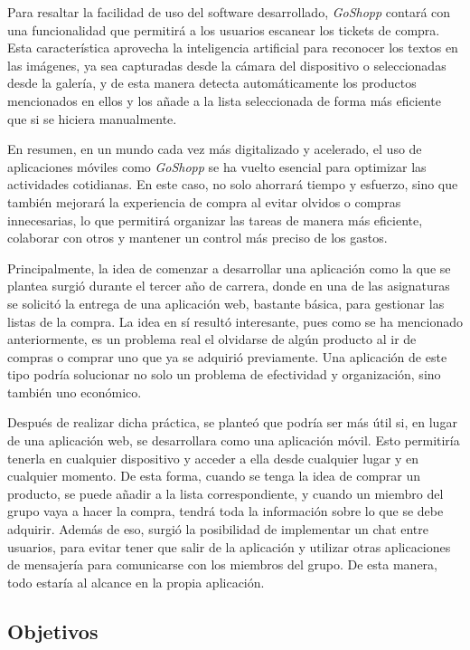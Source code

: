 \documentclass{article}
\begin{document}
Para resaltar la facilidad de uso del software desarrollado, \textit{GoShopp} contará con una funcionalidad que permitirá a los usuarios escanear los tickets de compra. Esta característica aprovecha la inteligencia artificial para reconocer los textos en las imágenes, ya sea capturadas desde la cámara del dispositivo o seleccionadas desde la galería, y de esta manera detecta automáticamente los productos mencionados en ellos y los añade a la lista seleccionada de forma más eficiente que si se hiciera manualmente.

En resumen, en un mundo cada vez más digitalizado y acelerado, el uso de aplicaciones móviles como \textit{GoShopp} se ha vuelto esencial para optimizar las actividades cotidianas. En este caso, no solo ahorrará tiempo y esfuerzo, sino que también mejorará la experiencia de compra al evitar olvidos o compras innecesarias, lo que permitirá organizar las tareas de manera más eficiente, colaborar con otros y mantener un control más preciso de los gastos.

Principalmente, la idea de comenzar a desarrollar una aplicación como la que se plantea surgió durante el tercer año de carrera, donde en una de las asignaturas se solicitó la entrega de una aplicación web, bastante básica, para gestionar las listas de la compra. La idea en sí resultó interesante, pues como se ha mencionado anteriormente, es un problema real el olvidarse de algún producto al ir de compras o comprar uno que ya se adquirió previamente. Una aplicación de este tipo podría solucionar no solo un problema de efectividad y organización, sino también uno económico.

Después de realizar dicha práctica, se planteó que podría ser más útil si, en lugar de una aplicación web, se desarrollara como una aplicación móvil. Esto permitiría tenerla en cualquier dispositivo y acceder a ella desde cualquier lugar y en cualquier momento. De esta forma, cuando se tenga la idea de comprar un producto, se puede añadir a la lista correspondiente, y cuando un miembro del grupo vaya a hacer la compra, tendrá toda la información sobre lo que se debe adquirir. Además de eso, surgió la posibilidad de implementar un chat entre usuarios, para evitar tener que salir de la aplicación y utilizar otras aplicaciones de mensajería para comunicarse con los miembros del grupo. De esta manera, todo estaría al alcance en la propia aplicación.

\subsection{Objetivos}
\end{document}
